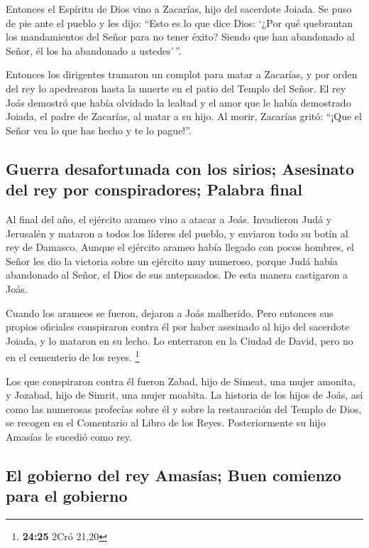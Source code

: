  Entonces el Espíritu de Dios vino a Zacarías, hijo del
sacerdote Joiada. Se puso de pie ante el pueblo y les dijo: ``Esto es lo
que dice Dios: `¿Por qué quebrantan los mandamientos del Señor para no
tener éxito? Siendo que han abandonado al Señor, él los ha abandonado a
ustedes'\,''.

 Entonces los dirigentes tramaron un complot para matar a
Zacarías, y por orden del rey lo apedrearon hasta la muerte en el patio
del Templo del Señor.  El rey Joás demostró que había
olvidado la lealtad y el amor que le había demostrado Joiada, el padre
de Zacarías, al matar a su hijo. Al morir, Zacarías gritó: ``¡Que el
Señor vea lo que has hecho y te lo pague!''.

\hypertarget{guerra-desafortunada-con-los-sirios-asesinato-del-rey-por-conspiradores-palabra-final}{%
\subsection{Guerra desafortunada con los sirios; Asesinato del rey por
conspiradores; Palabra
final}\label{guerra-desafortunada-con-los-sirios-asesinato-del-rey-por-conspiradores-palabra-final}}

 Al final del año, el ejército arameo vino a atacar a
Joás. Invadieron Judá y Jerusalén y mataron a todos los líderes del
pueblo, y enviaron todo su botín al rey de Damasco. 
Aunque el ejército arameo había llegado con pocos hombres, el Señor les
dio la victoria sobre un ejército muy numeroso, porque Judá había
abandonado al Señor, el Dios de sus antepasados. De esta manera
castigaron a Joás.

 Cuando los arameos se fueron, dejaron a Joás malherido.
Pero entonces sus propios oficiales conspiraron contra él por haber
asesinado al hijo del sacerdote Joiada, y lo mataron en su lecho. Lo
enterraron en la Ciudad de David, pero no en el cementerio de los reyes.
\footnote{\textbf{24:25} 2Cró 21,20}

 Los que conspiraron contra él fueron Zabad, hijo de
Simeat, una mujer amonita, y Jozabad, hijo de Simrit, una mujer moabita.
 La historia de los hijos de Joás, así como las numerosas
profecías sobre él y sobre la restauración del Templo de Dios, se
recogen en el Comentario al Libro de los Reyes. Posteriormente su hijo
Amasías le sucedió como rey.

\hypertarget{el-gobierno-del-rey-amasuxedas-buen-comienzo-para-el-gobierno}{%
\subsection{El gobierno del rey Amasías; Buen comienzo para el
gobierno}\label{el-gobierno-del-rey-amasuxedas-buen-comienzo-para-el-gobierno}}


